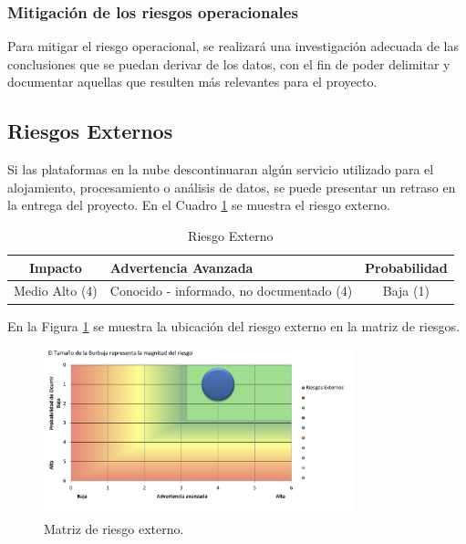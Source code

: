 \subsubsection{Mitigación de los riesgos operacionales}

Para mitigar el riesgo operacional, se realizará una investigación adecuada de
las conclusiones que se puedan derivar de los datos, con el fin de poder
delimitar y documentar aquellas que resulten más relevantes para el proyecto.

\subsection{Riesgos Externos}

Si las plataformas en la nube descontinuaran algún servicio utilizado para el
alojamiento, procesamiento o análisis de datos, se puede presentar un retraso
en la entrega del proyecto. En el Cuadro \ref{table:riesgo_externo} se muestra
el riesgo externo.

\begin{table}[H]
\centering
\begin{tabular}{|c|p{5cm}|c|}
\hline
\rowcolor{azulclaro}
  \centering\textbf{Impacto} & \centering\textbf{Advertencia Avanzada}\arraybackslash & \centering\textbf{Probabilidad}\arraybackslash \\
\hline
  Medio Alto (4) & Conocido - informado, no documentado (4) & Baja (1) \\
\hline
\end{tabular}
\caption{Riesgo Externo}
\label{table:riesgo_externo}
\end{table}

En la Figura \ref{fig:riesgo_externo} se muestra la ubicación del riesgo
externo en la matriz de riesgos.

\begin{figure}[H]
  \centering
  \includegraphics[width=0.8\textwidth]{imagenes/03-analisis/analisis-riesgos/riesgo-externo.png}
  \caption{Matriz de riesgo externo.}
  \label{fig:riesgo_externo}
\end{figure}

